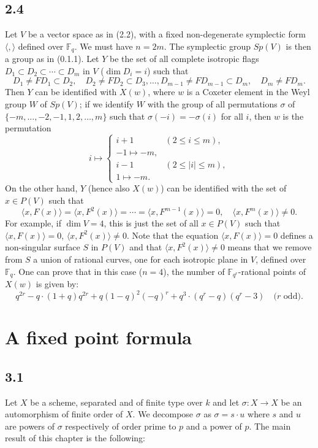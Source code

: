 \documentclass[11pt]{amsart}
\theoremstyle{plain}
\theoremstyle{remark}
\begin{document}
\subsection{2.4} Let $V$ be a vector space as in (2.2), with a fixed non-degenerate symplectic form $\langle, \rangle$ defined over $\mathbb{F}_q$. We must have $n = 2m$. The symplectic group $Sp(V)$ is then a group as in (0.1.1). Let $Y$ be the set of all complete isotropic flags $D_1 \subset D_2 \subset \cdots \subset D_m$ in $V$ ($\dim D_i = i$) such that
\[
D_1 \neq FD_1 \subset D_2, \quad D_2 \neq FD_2 \subset D_3, \dots, D_{m-1} \neq FD_{m-1} \subset D_m, \quad D_m \neq FD_m.
\]
Then $Y$ can be identified with $X(w)$, where $w$ is a Coxeter element in the Weyl group $W$ of $Sp(V)$; if we identify $W$ with the group of all permutations $\sigma$ of $\{-m, \dots, -2, -1, 1, 2, \dots, m\}$ such that $\sigma(-i) = -\sigma(i)$ for all $i$, then $w$ is the permutation
\[
i \mapsto \begin{cases}
i+1 & (2 \le i \le m), \\
-1 \mapsto -m, & \\
i-1 & (2 \le |i| \le m), \\
1 \mapsto -m.
\end{cases}
\]
On the other hand, $Y$ (hence also $X(w)$) can be identified with the set of $x \in P(V)$ such that
\[
\langle x, F(x) \rangle = \langle x, F^2(x) \rangle = \cdots = \langle x, F^{m-1}(x) \rangle = 0, \quad \langle x, F^m(x) \rangle \neq 0.
\]
For example, if $\dim V = 4$, this is just the set of all $x \in P(V)$ such that $\langle x, F(x) \rangle = 0$, $\langle x, F^2(x) \rangle \neq 0$. Note that the equation $\langle x, F(x) \rangle = 0$ defines a non-singular surface $S$ in $P(V)$ and that $\langle x, F^2(x) \rangle \neq 0$ means that we remove from $S$ a union of rational curves, one for each isotropic plane in $V$, defined over $\mathbb{F}_q$. One can prove that in this case ($n = 4$), the number of $\mathbb{F}_{q^r}$-rational points of $X(w)$ is given by:
\[
q^{2r} - q \cdot (1+q)q^{2r} + q(1-q)^2(-q)^r + q^3 \cdot (q^r - q)(q^r - 3) \quad \text{($r$ odd)}.
\]

\section{A fixed point formula}

\subsection{3.1} Let $X$ be a scheme, separated and of finite type over $k$ and let $\sigma: X \to X$ be an automorphism of finite order of $X$. We decompose $\sigma$ as $\sigma = s \cdot u$ where $s$ and $u$ are powers of $\sigma$ respectively of order prime to $p$ and a power of $p$. The main result of this chapter is the following:
\end{document}
